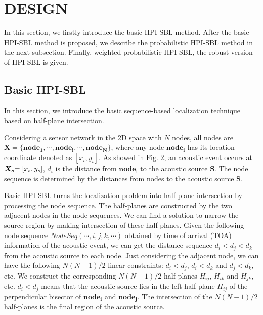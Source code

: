

\section{DESIGN}

In this section, we firstly introduce the basic HPI-SBL method.
After the basic HPI-SBL method is proposed, we describe the probabilistic HPI-SBL method in the next subsection. Finally, weighted probabilistic HPI-SBL, the robust version of HPI-SBL is given.

\subsection{Basic HPI-SBL }

In this section, we introduce the basic sequence-based localization technique based on half-plane intersection.

Considering a sensor network in the 2D space with $N$ nodes, all nodes are $\bm{X} = \{ \bm{nod{e_1}}, \cdots ,\bm{nod{e_i}}, \cdots ,\bm{nod{e_N}}\}$, 
where any node $\bm{nod{e_i}}$ has its location coordinate denoted as $[{x_i},{y_i}]$. 
As showed in Fig. 2, an acoustic event occurs at $\bm{X_s}{\rm{ = [}}{x_s},{y_s}]$, ${d_i}$ is the distance from $\bm{nod{e_i}}$ to the acoustic source $\bm{S}$.
The node sequence is determined by the distances from nodes to the acoustic source $\bm{S}$.

Basic HPI-SBL turns the localization problem into half-plane intersection by processing the node sequence. 
The half-planes are constructed by the two adjacent nodes in the node sequences. 
We can find a solution to narrow the source region by making intersection of these half-planes. 
Given the following node sequence $NodeSeq( \cdots ,i,j,k,\cdots )$  obtained by time of arrival (TOA) information of the acoustic event,
we can get the distance sequence ${d_i} < {d_j} < {d_k} $ from  the acoustic source  to each node.
Just considering the adjacent node, we can have the following $N(N-1)/2$ linear constraints: $d_i<d_j$, $d_i<d_k$ and $d_j<d_k$, etc. 
We construct the corresponding $N(N-1)/2$  half-planes $H_{ij}$, $H_{ik}$ and $H_{jk}$, etc.
$d_i<d_j$ means that the acoustic source lies in the left half-plane $H_{ij}$ of the perpendicular bisector of $\bm{nod{e_i}}$ and $\bm{nod{e_j}}$.
The intersection of  the $N(N-1)/2$  half-planes is the final region of the acoustic source.

